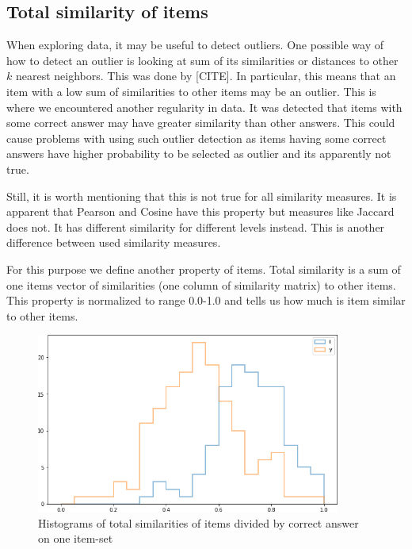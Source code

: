 \documentclass[
  digital, %
  table,   %
  nolof,     %
  nolot,     %
  nocover,
  color
]{fithesis3}
\begin{document}

\subsection{Total similarity of items}\label{total-similarity-of-items}

When exploring data, it may be useful to detect outliers. One possible way of how to detect an outlier is looking at sum of its similarities or distances to other $k$ nearest neighbors. This was done by [CITE]. In particular, this means that an item with a low sum of similarities to other items may be an outlier. This is where we encountered another regularity in data. It was detected that items with some correct answer may have greater similarity than other answers. This could cause problems with using such outlier detection as items having some correct answers have higher probability to be selected as outlier and its apparently not true.

Still, it is worth mentioning that this is not true for all similarity measures. It is apparent that Pearson and Cosine have this property but measures like Jaccard does not. It has different similarity for different levels instead. This is another difference between used similarity measures.

For this purpose we define another property of items. Total similarity is a sum of one items vector of similarities (one column of similarity matrix) to other items. This property is normalized to range 0.0-1.0 and tells us how much is item similar to other items.

\begin{figure}
  \includegraphics[width=10cm]{img/histogram_i_y}
  \caption{Histograms of total similarities of items divided by correct answer on one item-set}
  \label{fig:histogram_i_y}
\end{figure}

\end{document}
